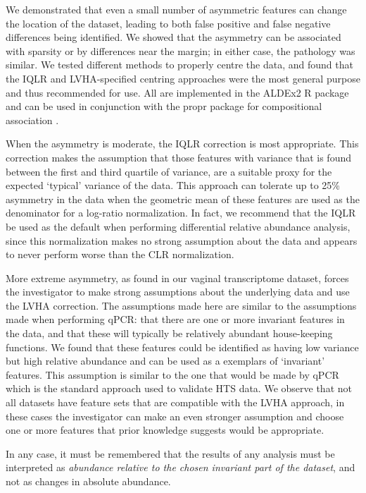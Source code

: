 \documentclass{bmcart}
\begin{document}
We demonstrated that even a small number of asymmetric features can change the location of the dataset, leading to both false positive and false negative differences being identified. We showed that the asymmetry can be associated with sparsity or by differences near the margin; in either case, the pathology was similar. We tested  different methods to properly centre the data, and found that the IQLR and LVHA-specified centring approaches were the most general purpose and thus recommended for use. All are implemented in the ALDEx2 R package and can be used in conjunction with the propr package for compositional association \cite{Quinn:2017}. 

When the asymmetry is moderate, the IQLR correction is most appropriate. This correction makes the assumption that those features with variance that is found between the first and third quartile of variance, are a suitable proxy for the expected `typical' variance of the data. This approach can tolerate up to 25\% asymmetry in the data when the geometric mean of these features are used as the denominator for a log-ratio normalization. In fact, we recommend that the IQLR be used as the default when performing differential relative abundance analysis, since this normalization makes no strong assumption about the data and appears to never perform worse than the CLR normalization.

More extreme asymmetry, as found in our vaginal transcriptome dataset, forces the investigator to make strong assumptions about the underlying data and use the LVHA correction. The assumptions made here are similar to the assumptions made when performing qPCR: that there are one or more invariant features in the data, and that these will typically be relatively abundant house-keeping functions. We found that these features could be identified as having low variance but high relative abundance and can be used as a exemplars of `invariant' features. This assumption is similar to the one that would be made by qPCR which is the standard approach used to validate HTS data. We observe that not all datasets have feature sets that are compatible with the LVHA approach, in these cases the investigator can make an even stronger assumption and choose one or more features that prior knowledge suggests would be appropriate. 

In any case, it must be remembered that the results of any analysis must be interpreted as \emph{abundance relative to the chosen invariant part of the dataset}, and not as changes in absolute abundance.
\end{document}

